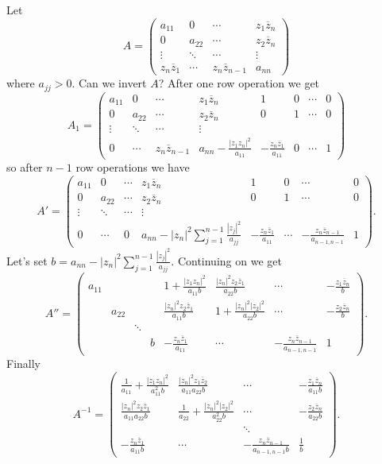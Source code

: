 \documentclass[10pt,a4paper]{amsart}
\def\ov#1{\overline{#1}}
\begin{document}
Let
$$
A = \begin{pmatrix}
a_{11} & 0 & \cdots & z_1 \ov z_n
\\
0 & a_{22} & \cdots & z_2 \ov z_n
\\
\vdots & \ddots & \cdots & \vdots
\\
z_n \ov z_1 & \cdots & z_n \ov z_{n-1} & a_{nn}
\end{pmatrix}
$$
where $a_{jj} > 0$.
Can we invert $A$?
After one row operation we get
$$
A_1 =
\left(
\begin{array}{cccc|cccc}
a_{11} & 0 & \cdots & z_1 \ov z_n
&
1 & 0 & \cdots & 0
\\
0 & a_{22} & \cdots & z_2 \ov z_n
&
0 & 1 & \cdots & 0
\\
\vdots & \ddots & \cdots & \vdots
\\
0 & \cdots & z_{n} \ov z_{n-1} & a_{nn} - \frac{|z_1 z_n|^2}{a_{11}}
&
- \frac{z_n \ov z_1}{a_{11}} & 0 & \cdots & 1
\end{array}
\right)
$$
so after $n-1$ row operations we have
$$
A' =
\left(
\begin{array}{cccc|cccc}
a_{11} & 0 & \cdots & z_1 \ov z_n
&
1 & 0 & \cdots & 0
\\
0 & a_{22} & \cdots & z_2 \ov z_n
&
0 & 1 & \cdots & 0
\\
\vdots & \ddots & \cdots & \vdots
\\
0 & \cdots & 0 & a_{nn} - |z_n|^2 \sum_{j=1}^{n-1} \frac{|z_j|^2}{a_{jj}}
&
-\frac{z_n \ov z_1}{a_{11}} & \cdots & -\frac{z_{n} \ov z_{n-1}}{a_{n-1,n-1}} & 1
\end{array}
\right).
$$
Let's set $b = a_{nn} - |z_n|^2 \sum_{j=1}^{n-1} \frac{|z_j|^2}{a_{jj}}$.
Continuing on we get
$$
A'' =
\left(
\begin{array}{cccc|cccc}
a_{11} &  & &
&
1 + \frac{|z_1z_n|^2}{a_{11} b} &
\frac{|z_n|^2 z_2 \ov z_1}{a_{22} b} &
\cdots &
- \frac{z_1 \ov z_n}{b}
\\
 & a_{22} & &
&
\frac{|z_n|^2 z_2 \ov z_1}{a_{11}b} &
1 + \frac{|z_n|^2|z_2|^2}{a_{22} b} &
\cdots &
-\frac{z_2 \ov z_n}{b}
\\
  & & \ddots & &
\\
 & &  & b
&
-\frac{z_n \ov z_1}{a_{11}} &
\cdots &
-\frac{z_{n} \ov z_{n-1}}{a_{n-1,n-1}} &
1
\end{array}
\right).
$$
Finally
$$
A^{-1} =
\left(
\begin{array}{cccc}
\frac{1}{a_{11}} + \frac{|z_1z_n|^2}{a_{11}^2 b} &
\frac{|z_n|^2 z_1 \ov z_2}{a_{11} a_{22} b} & \cdots &
- \frac{z_1 \ov z_n}{a_{11} b}
\\
\frac{|z_n|^2 z_2 \ov z_1}{a_{11} a_{22} b} &
\frac{1}{a_{22}} + \frac{|z_n|^2|z_2|^2}{a_{22}^2 b} & \cdots &
-\frac{z_2 \ov z_n}{a_{22} b}
\\
& & \ddots &
\\
-\frac{z_n \ov z_1}{a_{11}b} & \cdots &
-\frac{z_{n} \ov z_{n-1}}{a_{n-1,n-1}b} &
\frac 1b
\end{array}
\right).
$$
\end{document}
